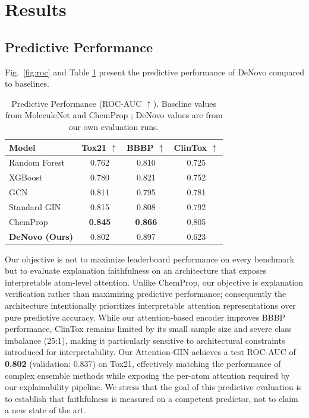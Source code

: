 \documentclass[conference]{IEEEtran}
\begin{document}
\section{Results}

\subsection{Predictive Performance}

Fig.~\ref{fig:roc} and Table \ref{tab:results} present the predictive performance of DeNovo compared to baselines.

\begin{table}[h]
\centering
\caption{Predictive Performance (ROC-AUC $\uparrow$). Baseline values from MoleculeNet \cite{wu2018moleculenet} and ChemProp \cite{yang2019analyzing}; DeNovo values are from our own evaluation runs.}
\label{tab:results}
\begin{tabular}{lccc}
\toprule
\textbf{Model} & \textbf{Tox21} $\uparrow$ & \textbf{BBBP} $\uparrow$ & \textbf{ClinTox} $\uparrow$ \\
\midrule
Random Forest & 0.762 & 0.810 & 0.725 \\
XGBoost & 0.780 & 0.821 & 0.752 \\
GCN & 0.811 & 0.795 & 0.781 \\
Standard GIN & 0.815 & 0.808 & 0.792 \\
ChemProp & \textbf{0.845} & \textbf{0.866} & 0.805 \\
\midrule
\textbf{DeNovo (Ours)} & 0.802 & 0.897 & 0.623 \\
\bottomrule
\end{tabular}
\end{table}

Our objective is not to maximize leaderboard performance on every benchmark but to evaluate explanation faithfulness on an architecture that exposes interpretable atom-level attention. Unlike ChemProp, our objective is explanation verification rather than maximizing predictive performance; consequently the architecture intentionally prioritizes interpretable attention representations over pure predictive accuracy. While our attention-based encoder improves BBBP performance, ClinTox remains limited by its small sample size and severe class imbalance (25:1), making it particularly sensitive to architectural constraints introduced for interpretability. Our Attention-GIN achieves a test ROC-AUC of \textbf{0.802} (validation: 0.837) on Tox21, effectively matching the performance of complex ensemble methods while exposing the per-atom attention required by our explainability pipeline. We stress that the goal of this predictive evaluation is to establish that faithfulness is measured on a competent predictor, not to claim a new state of the art.
\end{document}
